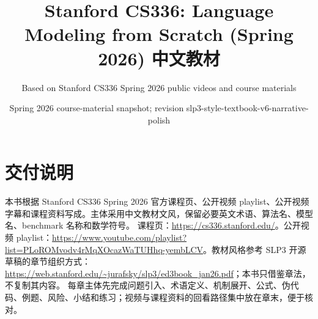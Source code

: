 \documentclass[a4paper]{article}
\title{Stanford CS336: Language Modeling from Scratch (Spring 2026) 中文教材}
\author{Based on Stanford CS336 Spring 2026 public videos and course materials}
\date{Spring 2026 course-material snapshot; revision slp3-style-textbook-v6-narrative-polish}
\begin{document}
\maketitle
\tableofcontents
\newpage
\section*{交付说明}
本书根据 Stanford CS336 Spring 2026 官方课程页、公开视频 playlist、公开视频字幕和课程资料写成。主体采用中文教材文风，保留必要英文术语、算法名、模型名、benchmark 名称和数学符号。
课程页：\url{https://cs336.stanford.edu/}。公开视频 playlist：\url{https://www.youtube.com/playlist?list=PLoROMvodv4rMqXOcazWaTUHhq-yembLCV}。教材风格参考 SLP3 开源草稿的章节组织方式：\url{https://web.stanford.edu/~jurafsky/slp3/ed3book_jan26.pdf}；本书只借鉴章法，不复制其内容。
每章主体先完成问题引入、术语定义、机制展开、公式、伪代码、例题、风险、小结和练习；视频与课程资料的回看路径集中放在章末，便于核对。
\end{document}
